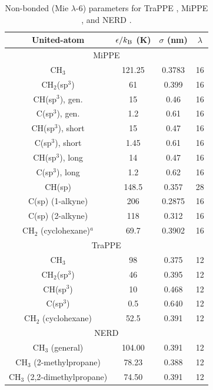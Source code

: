 \documentclass[journal=jced,manuscript=article]{achemso}
\begin{document}
    \begin{table}[h!]
		\caption{Non-bonded (Mie $\lambda$-6) parameters for TraPPE \cite{TraPPE,Martin1999,Keasler2012}, MiPPE \cite{Mie,Potoff_branched,Barhaghi2017}, and NERD \cite{NERD,Nath2001}.} \label{tab:nonbonded params}
		\begin{center}
			\begin{tabular}{|c|c|c|c|}
				\hline
				United-atom & $\epsilon/k_{\rm B}$ (K) & $\sigma$ (nm) & $\lambda$ \\ \hline
				\multicolumn{4}{|c|}{MiPPE} \\ \hline
				CH$_3$ & 121.25 & 0.3783 & 16  \\ 
				CH$_2$(sp$^3$) & 61 & 0.399 & 16 \\ 
				CH(sp$^3$), gen. & 15 & 0.46 & 16\\
				C(sp$^3$), gen. & 1.2 & 0.61 & 16\\
				CH(sp$^3$), short & 15 & 0.47 & 16\\
				C(sp$^3$), short & 1.45 & 0.61 & 16\\
				CH(sp$^3$), long & 14 & 0.47 & 16\\
				C(sp$^3$), long & 1.2 & 0.62 & 16\\
				CH(sp) & 148.5 & 0.357 & 28\\
				C(sp) (1-alkyne) & 206 & 0.2875 & 16\\
				C(sp) (2-alkyne) & 118 & 0.312 & 16\\
				CH$_2$ (cyclohexane)$^a$ & 69.7 & 0.3902 & 16 \\
				\hline
                \multicolumn{4}{|c|}{TraPPE} \\ \hline
                CH$_3$ & 98 & 0.375 & 12 \\ 
                CH$_2$(sp$^3$) & 46 & 0.395 & 12\\ 
                CH(sp$^3$) & 10 & 0.468 & 12 \\
                C(sp$^3$) & 0.5 & 0.640 & 12 \\
                CH$_2$ (cyclohexane) & 52.5 & 0.391 & 12 \\
                \hline
                \multicolumn{4}{|c|}{NERD} \\ \hline
				CH$_3$ (general) & 104.00  & 0.391 & 12\\ 
				CH$_3$ (2-methylpropane) & 78.23  & 0.388 & 12\\ 
				CH$_3$ (2,2-dimethylpropane) & 74.50  & 0.391 & 12 \\  

\end{tabular}
\end{center}
\end{table}
\end{document}
